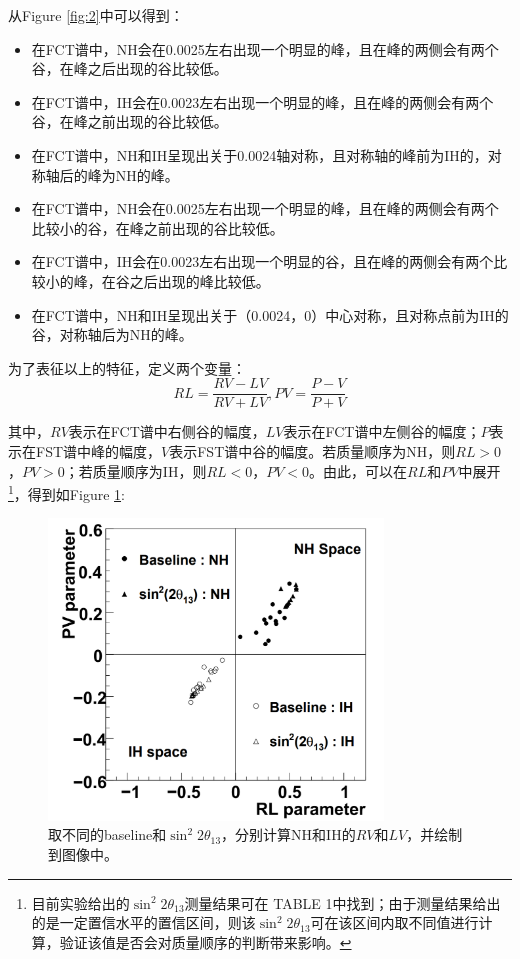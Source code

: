 \documentclass[10pt,a4paper]{article}
\begin{document}
从Figure \ref{fig:2}中可以得到：
\begin{itemize}
	\item{在FCT谱中，NH会在0.0025左右出现一个明显的峰，且在峰的两侧会有两个谷，在峰之后出现的谷比较低。}
    \item{在FCT谱中，IH会在0.0023左右出现一个明显的峰，且在峰的两侧会有两个谷，在峰之前出现的谷比较低。}
    \item{在FCT谱中，NH和IH呈现出关于0.0024轴对称，且对称轴的峰前为IH的，对称轴后的峰为NH的峰。}
    \item{在FCT谱中，NH会在0.0025左右出现一个明显的峰，且在峰的两侧会有两个比较小的谷，在峰之前出现的谷比较低。}
    \item{在FCT谱中，IH会在0.0023左右出现一个明显的谷，且在峰的两侧会有两个比较小的峰，在谷之后出现的峰比较低。}
    \item{在FCT谱中，NH和IH呈现出关于（0.0024，0）中心对称，且对称点前为IH的谷，对称轴后为NH的峰。}
\end{itemize}

为了表征以上的特征，定义两个变量：
\[
RL=\frac{RV-LV}{RV+LV},
PV=\frac{P-V}{P+V}
\]

其中，$RV$表示在FCT谱中右侧谷的幅度，$LV$表示在FCT谱中左侧谷的幅度；$P$表示在FST谱中峰的幅度，$V$表示FST谱中谷的幅度。若质量顺序为NH，则$RL>0$，$PV>0$；若质量顺序为IH，则$RL<0$，$PV<0$。由此，可以在$RL$和$PV$中展开\footnote{目前实验给出的$\sin^2 2\theta_{13}$测量结果可在\cite{Zhan:2008id} TABLE 1中找到；由于测量结果给出的是一定置信水平的置信区间，则该$\sin^2 2\theta_{13}$可在该区间内取不同值进行计算，验证该值是否会对质量顺序的判断带来影响。}，得到如Figure \ref{fig:33}:

\begin{figure}[H]
 \centering
 \includegraphics[height=8cm]{images/PVRL.png}
 \caption{取不同的baseline和$\sin^2 2\theta_{13}$，分别计算NH和IH的$RV$和$LV$，并绘制到图像中。}
 \label{fig:33}
\end{figure}
\end{document}
